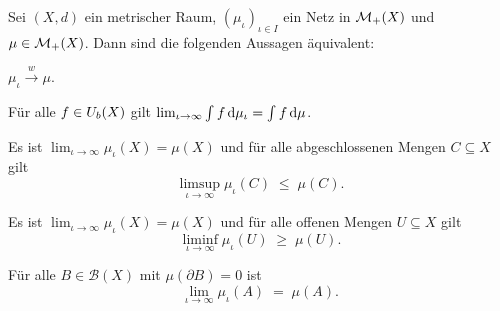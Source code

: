 \documentclass[../main/main.tex]{subfiles}
\begin{document}
	\begin{Satz}[Portmanteau]
		\label{thm:portmanteau}
		Sei $(X, d)$ ein metrischer Raum, $(\mu_\iota)_{\iota \in I}$ ein Netz in $\mathcal{M}_{+}(X)$
		und $\mu \in \mathcal{M}_{+}(X)$. Dann sind die folgenden Aussagen äquivalent:
		\begin{equivalentthm}
			\item $\mu_\iota \xrightarrow{w} \mu$.
			\item Für alle $f \in U_b(X)$ gilt $\lim_{\iota \to \infty} \int_{} \, f \, \mathrm{d}\mu_\iota = \int_{} \, f \, \mathrm{d}\mu$.
			\item Es ist 
			$\lim_{\iota \to \infty} \mu_\iota(X) = \mu(X)$
			und für alle abgeschlossenen Mengen $C \subseteq X$ gilt 
			$$\limsup_{\iota \to \infty} \mu_\iota(C) \; \leq \; \mu(C) \text{.}$$
			\item Es ist 
			$\lim_{\iota \to \infty} \mu_\iota(X) = \mu(X)$
			und für alle offenen Mengen $U \subseteq X$ gilt 
			$$\liminf_{\iota \to \infty} \mu_\iota(U) \; \geq \; \mu(U) \text{.}$$
			\item Für alle $B \in \mathcal{B}(X)$ mit $\mu(\partial B) = 0$ 
			ist $$\lim_{\iota \to \infty} \mu_\iota(A) \; = \; \mu(A) \text{.}$$
		\end{equivalentthm}
	\end{Satz}
	
\end{document}
